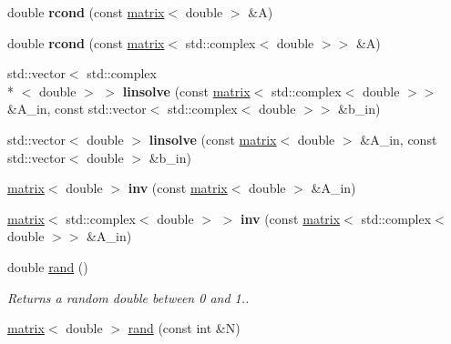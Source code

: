 \begin{DoxyCompactItemize}
\item 
\hypertarget{namespacekeycpp_a3905cfc35dbd146f5dbf7bcb5729c2c2}{double {\bfseries rcond} (const \hyperlink{classkeycpp_1_1matrix}{matrix}$<$ double $>$ \&A)}\label{namespacekeycpp_a3905cfc35dbd146f5dbf7bcb5729c2c2}

\item 
\hypertarget{namespacekeycpp_a4d9a9dd04453e5a417f7a9eb8ae4391b}{double {\bfseries rcond} (const \hyperlink{classkeycpp_1_1matrix}{matrix}$<$ std\-::complex$<$ double $>$$>$ \&A)}\label{namespacekeycpp_a4d9a9dd04453e5a417f7a9eb8ae4391b}

\item 
\hypertarget{namespacekeycpp_a9f68b3d9143ad3582e59dd0a4b1998b8}{std\-::vector$<$ std\-::complex\\*
$<$ double $>$ $>$ {\bfseries linsolve} (const \hyperlink{classkeycpp_1_1matrix}{matrix}$<$ std\-::complex$<$ double $>$$>$ \&A\-\_\-in, const std\-::vector$<$ std\-::complex$<$ double $>$$>$ \&b\-\_\-in)}\label{namespacekeycpp_a9f68b3d9143ad3582e59dd0a4b1998b8}

\item 
\hypertarget{namespacekeycpp_a46f4a25648e5bad1cf0bd0e7fca7fae0}{std\-::vector$<$ double $>$ {\bfseries linsolve} (const \hyperlink{classkeycpp_1_1matrix}{matrix}$<$ double $>$ \&A\-\_\-in, const std\-::vector$<$ double $>$ \&b\-\_\-in)}\label{namespacekeycpp_a46f4a25648e5bad1cf0bd0e7fca7fae0}

\item 
\hypertarget{namespacekeycpp_adc96927cda2df7a6e8e2031941c43601}{\hyperlink{classkeycpp_1_1matrix}{matrix}$<$ double $>$ {\bfseries inv} (const \hyperlink{classkeycpp_1_1matrix}{matrix}$<$ double $>$ \&A\-\_\-in)}\label{namespacekeycpp_adc96927cda2df7a6e8e2031941c43601}

\item 
\hypertarget{namespacekeycpp_a6b74369f5415c3ed45f63995149ad992}{\hyperlink{classkeycpp_1_1matrix}{matrix}$<$ std\-::complex$<$ double $>$ $>$ {\bfseries inv} (const \hyperlink{classkeycpp_1_1matrix}{matrix}$<$ std\-::complex$<$ double $>$$>$ \&A\-\_\-in)}\label{namespacekeycpp_a6b74369f5415c3ed45f63995149ad992}

\item 
\hypertarget{namespacekeycpp_a5ef5c1f5951e8182a7c4ec9612f3f7e1}{double \hyperlink{namespacekeycpp_a5ef5c1f5951e8182a7c4ec9612f3f7e1}{rand} ()}\label{namespacekeycpp_a5ef5c1f5951e8182a7c4ec9612f3f7e1}

\begin{DoxyCompactList}\small\item\em Returns a random double between 0 and 1.. \end{DoxyCompactList}\item 
\hypertarget{namespacekeycpp_ae5c6c79ad914131dfc2b0ae22c6d5017}{\hyperlink{classkeycpp_1_1matrix}{matrix}$<$ double $>$ \hyperlink{namespacekeycpp_ae5c6c79ad914131dfc2b0ae22c6d5017}{rand} (const int \&N)}\label{namespacekeycpp_ae5c6c79ad914131dfc2b0ae22c6d5017}


\end{DoxyCompactItemize}
